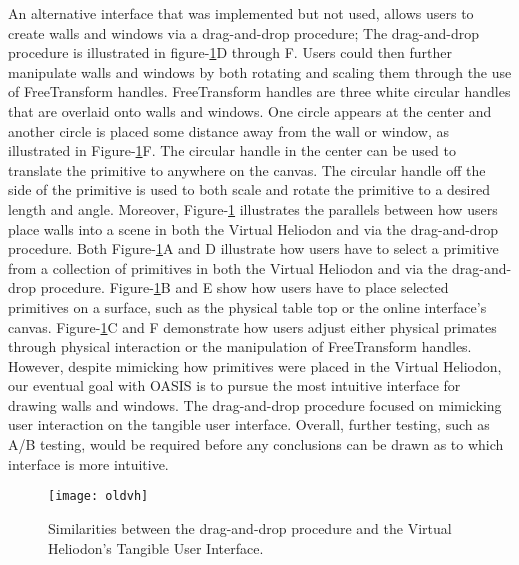 An alternative interface that was implemented but not used, allows users to create walls and windows via a drag-and-drop procedure;
The drag-and-drop procedure is illustrated in figure-\ref{fig:oldvh}D through F.
Users could then further manipulate walls and windows by both rotating and scaling them through the use of FreeTransform handles. 
FreeTransform handles are three white circular handles that are overlaid onto walls and windows.
One circle appears at the center and another circle is placed some distance away from the wall or window, as illustrated in Figure-\ref{fig:oldvh}F.
The circular handle in the center can be used to translate the primitive to anywhere on the canvas.
The circular handle off the side of the primitive is used to both scale and rotate the primitive to a desired length and angle.
Moreover, Figure-\ref{fig:oldvh} illustrates the parallels between how users place walls  into a scene in both the Virtual Heliodon and via the drag-and-drop procedure.
Both Figure-\ref{fig:oldvh}A and D illustrate how users have to select a primitive from a collection of primitives in both the Virtual Heliodon and via the drag-and-drop procedure.
Figure-\ref{fig:oldvh}B and E show how users have to place selected primitives on a surface, such as the physical table top or the online interface's canvas.
Figure-\ref{fig:oldvh}C and F demonstrate how users adjust either physical primates through physical interaction or the manipulation of FreeTransform handles.
However, despite mimicking how primitives were placed in the Virtual Heliodon, our eventual goal with OASIS is to pursue the most intuitive interface for drawing walls and windows.
The  drag-and-drop procedure focused on mimicking user interaction on the tangible user interface.
Overall, further testing, such as A/B testing, would be required before any conclusions can be drawn as to which interface is more intuitive.\\

\begin{figure}[h]
\centering
\texttt{[image: oldvh]}
\caption{
Similarities between the drag-and-drop procedure and the Virtual Heliodon's Tangible User Interface. 
}
\label{fig:oldvh}
\end{figure}

